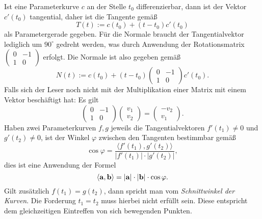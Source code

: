 Ist eine Parameterkurve $c$ an der Stelle $t_0$ differenzierbar,
dann ist der Vektor $c'(t_0)$ tangential, daher ist die Tangente
gemäß
\[T(t) := c(t_0)+(t-t_0)c'(t_0)\]
als Parametergerade gegeben. Für die Normale braucht der
Tangentialvektor lediglich um $90^\circ$ gedreht werden,
was durch Anwendung der Rotationsmatrix
$(\begin{smallmatrix}0 & -1\\ 1 & 0\end{smallmatrix})$
erfolgt. Die Normale ist also gegeben gemäß
\[N(t) := c(t_0)+(t-t_0)\begin{pmatrix}0 & -1\\ 1 & 0\end{pmatrix}c'(t_0).\]
Falls sich der Leser noch nicht mit der Multiplikation einer
Matrix mit einem Vektor beschäftigt hat: Es gilt
\[\begin{pmatrix}
0 & -1\\ 1 & 0
\end{pmatrix}
\begin{pmatrix}
v_1\\ v_2
\end{pmatrix}
= \begin{pmatrix}
-v_2\\ v_1
\end{pmatrix}.\]
Haben zwei Parameterkurven $f,g$ jeweils die Tangentialvektoren
$f'(t_1)\ne 0$ und $g'(t_2)\ne 0$, ist der Winkel $\varphi$ zwischen
den Tangenten bestimmbar gemäß
\[\cos\varphi = \frac{\langle f'(t_1),g'(t_2)\rangle}{|f'(t_1)|\cdot |g'(t_2)|},\]
dies ist eine Anwendung der Formel
\[\langle\mathbf{a},\mathbf{b}\rangle = |\mathbf{a}|\cdot|\mathbf{b}|\cdot\cos\varphi.\]
Gilt zusätzlich $f(t_1)=g(t_2)$, dann spricht man vom
\emph{Schnittwinkel der Kurven}. Die Forderung $t_1=t_2$ muss hierbei
nicht erfüllt sein. Diese entspricht dem gleichzeitigen Eintreffen
von sich bewegenden Punkten.

